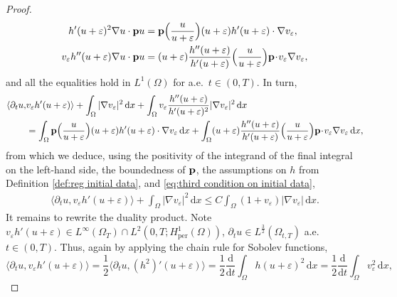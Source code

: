 \documentclass[11pt,a4paper,reqno]{amsart}
\theoremstyle{remark}
\theoremstyle{definition}
\numberwithin{equation}{section}
\newcommand{\per}{\mathrm{per}}
\newcommand{\p}{{\bf p}}
\renewcommand{\d}{\, \mathrm{d} }
\newcommand{\der}{\mathrm{d}}
\begin{document}
\begin{proof}
\begin{equation*}
   \begin{aligned} h'(u+\varepsilon)^2 \nabla u \cdot \p u &= \p \Big( \frac{u}{u+\varepsilon}\Big) (u+\varepsilon) h'(u+\varepsilon)\cdot \nabla v_\varepsilon, \\ 
        v_\varepsilon h''(u+\varepsilon) \nabla u \cdot \p u &= (u+\varepsilon) \frac{h''(u+\varepsilon)}{h'(u+\varepsilon)}\Big(\frac{u}{u+\varepsilon} \Big) \p \! \cdot \! v_\varepsilon \nabla v_\varepsilon, 
        \end{aligned}
\end{equation*}
and all the equalities hold in $L^1(\Omega)$ for a.e.~$t \in (0,T)$. In turn, 
\begin{equation*}
    \begin{aligned} \langle \partial_t u , & v_\varepsilon h'(u+\varepsilon) \rangle + \int_\Omega |\nabla v_\varepsilon|^2 \d x  + \int_\Omega v_\varepsilon \frac{h''(u+\varepsilon)}{h'(u+\varepsilon)^2} |\nabla v_\varepsilon|^2 \d x \\ 
  &=   \int_\Omega \p \Big( \frac{u}{u+\varepsilon}\Big) (u+\varepsilon) h'(u+\varepsilon)\cdot \nabla v_\varepsilon \d x + \int_\Omega (u+\varepsilon) \frac{h''(u+\varepsilon)}{h'(u+\varepsilon)}\Big(\frac{u}{u+\varepsilon} \Big) \p \! \cdot \! v_\varepsilon \nabla v_\varepsilon \d x, 
  \end{aligned}
\end{equation*}
from which we deduce, using the positivity of the integrand of the final integral on the left-hand side, the boundedness of $\p$, the assumptions on $h$ from Definition \ref{def:reg initial data}, and \eqref{eq:third condition on initial data}, 
\begin{equation}\label{eq:by returning to}
    \begin{aligned} \langle \partial_t u , v_\varepsilon h'(u+\varepsilon) \rangle + \int_\Omega |\nabla v_\varepsilon|^2 \d x  \leq  C \int_\Omega (1+v_\varepsilon) |\nabla v_\varepsilon| \d x. 
  \end{aligned}
\end{equation}
It remains to rewrite the duality product. Note $v_\varepsilon h'(u+\varepsilon) \in L^\infty(\Omega_T) \cap L^2(0,T;H^1_\per(\Omega))$, $\partial_t u \in L^{\frac{3}{2}}(\Omega_{t,T})$ {a.e.~}$t\in(0,T).$ Thus, again by applying the chain rule for Sobolev functions, 
\begin{equation*}
    \langle \partial_t u , v_\varepsilon h'(u+\varepsilon)  \rangle = \frac{1}{2} \langle \partial_t u ,(h^2)'(u+\varepsilon)  \rangle = \frac{1}{2}\frac{\der}{\der t}\int_\Omega h(u+\varepsilon)^{2} \d x = \frac{1}{2}\frac{\der}{\der t}\int_\Omega v_\varepsilon^2 \d x, 

\end{equation*}
\end{proof}
\end{document}
